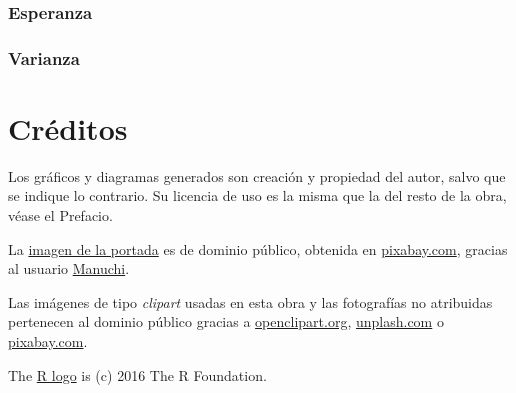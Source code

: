 \documentclass[
]{book}
\begin{document}
\hypertarget{esperanza}{%
\subsection{Esperanza}\label{esperanza}}

\hypertarget{varianza}{%
\subsection{Varianza}\label{varianza}}

\hypertarget{creditos}{%
\chapter{Créditos}\label{creditos}}

Los gráficos y diagramas generados son creación y propiedad del autor, salvo que se
indique lo contrario. Su licencia de uso es la misma que la del resto de la
obra, véase el Prefacio.

La \href{https://pixabay.com/es/illustrations/fondo-abstracto-l\%C3\%ADnea-ilustración-2462436/}{imagen de la portada} es de dominio público, obtenida en \href{https://pixabay.com/es/}{pixabay.com}, gracias al
usuario \href{https://pixabay.com/es/users/manuchi-1728328/}{Manuchi}.

Las imágenes de tipo \emph{clipart} usadas en esta obra y las fotografías no atribuidas
pertenecen al dominio público gracias a \href{http://www.openclipart.org}{openclipart.org}, \href{https://unsplash.com}{unplash.com} o \href{https://pixabay.com/es/}{pixabay.com}.

The \href{https://www.r-project.org/logo/}{R logo} is (c) 2016 The R Foundation.

  
\end{document}
